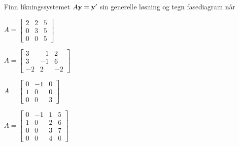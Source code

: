 

\begin{oppgave}
Finn likningssystemet $A\mathbf{y}=\mathbf{y}'$ sin generelle løsning og tegn fasediagram når
\begin{punkt}
$
A=
\begin{bmatrix}
2 & 2 & 5\\
0 & 3 & 5\\
0 & 0 & 5
\end{bmatrix}
$ 
\end{punkt}
%
\begin{punkt}
$
A=
\begin{bmatrix}
3 & -1 & 2\\
3 & -1 & 6\\
-2 & 2 & -2
\end{bmatrix}$
\end{punkt}

\begin{punkt}
$
A=
\begin{bmatrix}
0 & -1 & 0\\
1 & 0 & 0\\
0 & 0 & 3
\end{bmatrix}$
\end{punkt}



\begin{punkt}
$
A=
\begin{bmatrix}
0 & -1 & 1& 5\\
1 & 0 & 2& 6\\
0 & 0 & 3 & 7\\
0 & 0 & 4 & 0
\end{bmatrix}$
\end{punkt}


\end{oppgave}



